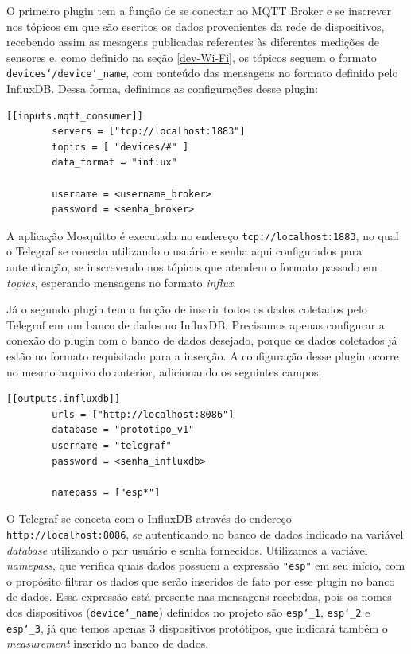 \documentclass[../monografia.tex]{subfiles}
\begin{document}
O primeiro plugin tem a função de se conectar ao MQTT Broker e se inscrever nos tópicos em que são escritos os dados provenientes da rede de dispositivos, recebendo assim as mesagens publicadas referentes às diferentes medições de sensores e, como definido na seção \ref{dev-Wi-Fi}, os tópicos seguem o formato \texttt{devices\char`/device\char`_name}, com conteúdo das mensagens no formato definido pelo InfluxDB. Dessa forma, definimos as configurações desse plugin:

\begin{lstlisting}[basicstyle=\small]
	[[inputs.mqtt_consumer]]
		servers = ["tcp://localhost:1883"]
		topics = [ "devices/#" ]
		data_format = "influx"

		username = <username_broker> 
		password = <senha_broker>
\end{lstlisting}

A aplicação Mosquitto é executada no endereço \texttt{tcp://localhost:1883}, no qual o Telegraf se conecta utilizando o usuário e senha aqui configurados para autenticação, se inscrevendo nos tópicos que atendem o formato passado em \textit{topics}, esperando mensagens no formato \textit{influx}. 

Já o segundo plugin tem a função de inserir todos os dados coletados pelo Telegraf em um banco de dados no InfluxDB. Precisamos apenas configurar a conexão do plugin com o banco de dados desejado, porque os dados coletados já estão no formato requisitado para a inserção. A configuração desse plugin ocorre no mesmo arquivo do anterior, adicionando os seguintes campos:

\begin{lstlisting}[basicstyle=\small]
	[[outputs.influxdb]]
		urls = ["http://localhost:8086"]
		database = "prototipo_v1"
		username = "telegraf"
		password = <senha_influxdb>

		namepass = ["esp*"]
\end{lstlisting}

O Telegraf se conecta com o InfluxDB através do endereço \texttt{http://localhost:8086}, se autenticando no banco de dados indicado na variável \textit{database} utilizando o par usuário e senha fornecidos. Utilizamos a variável \textit{namepass}, que verifica quais dados possuem a expressão \texttt{"esp"} em seu início, com o propósito filtrar os dados que serão inseridos de fato por esse plugin no banco de dados. Essa expressão está presente nas mensagens recebidas, pois os nomes dos dispositivos (\texttt{device\char`_name}) definidos no projeto são \texttt{esp\char`_1}, \texttt{esp\char`_2} e \texttt{esp\char`_3}, já que temos apenas 3 dispositivos protótipos, que indicará também o \textit{measurement} inserido no banco de dados. 
\end{document}
